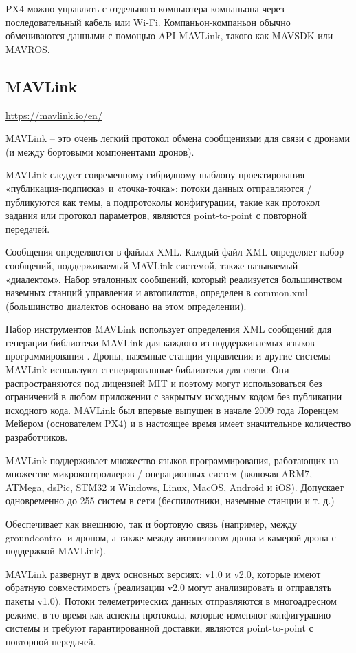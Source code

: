 PX4 можно управлять с отдельного компьютера-компаньона через последовательный кабель или Wi-Fi. Компаньон-компаньон обычно обмениваются данными с помощью API MAVLink, такого как MAVSDK или MAVROS.
\cite{px4}

\subsection{MAVLink}
\url{https://mavlink.io/en/}

MAVLink -- это очень легкий протокол обмена сообщениями для связи с дронами (и между бортовыми компонентами дронов).

MAVLink следует современному гибридному шаблону проектирования «публикация-подписка» и «точка-точка»: потоки данных отправляются / публикуются как темы, а подпротоколы конфигурации, такие как протокол задания или протокол параметров, являются point-to-point с повторной передачей.

Сообщения определяются в файлах XML. Каждый файл XML определяет набор сообщений, поддерживаемый MAVLink системой, также называемый «диалектом». Набор эталонных сообщений, который реализуется большинством наземных станций управления и автопилотов, определен в common.xml (большинство диалектов основано на этом определении).

Набор инструментов MAVLink использует определения XML сообщений для генерации библиотеки MAVLink для каждого из поддерживаемых языков программирования . Дроны, наземные станции управления и другие системы MAVLink используют сгенерированные библиотеки для связи. Они распространяются под лицензией MIT и поэтому могут использоваться без ограничений в любом приложении с закрытым исходным кодом без публикации исходного кода. MAVLink был впервые выпущен в начале 2009 года Лоренцем Мейером (основателем PX4) и в настоящее время имеет значительное количество разработчиков.

MAVLink поддерживает множество языков программирования, работающих на множестве микроконтроллеров / операционных систем (включая ARM7, ATMega, dsPic, STM32 и Windows, Linux, MacOS, Android и iOS). Допускает одновременно до 255 систем в сети (беспилотники, наземные станции и т. д.)

Обеспечивает как внешнюю, так и бортовую связь (например, между groundcontrol и дроном, а также между автопилотом дрона и камерой дрона с поддержкой MAVLink).
\cite{mavlink}

MAVLink развернут в двух основных версиях: v1.0 и v2.0, которые имеют обратную совместимость (реализации v2.0 могут анализировать и отправлять пакеты v1.0). Потоки телеметрических данных отправляются в многоадресном режиме, в то время как аспекты протокола, которые изменяют конфигурацию системы и требуют гарантированной доставки, являются point-to-point с повторной передачей.

